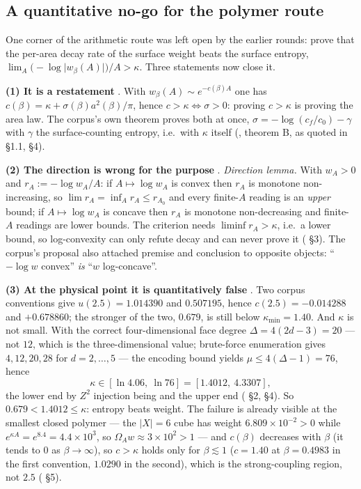 \subsection{A quantitative no-go for the polymer route}
\label{sec:scalar-polymer}

One corner of the arithmetic route was left open by the earlier rounds: prove that the per-area
decay rate of the surface weight beats the surface entropy,
$\lim_A\bigl(-\log\lvert w_\beta(A)\rvert\bigr)/A>\kappa$. Three statements now close it.

\textbf{(1) It is a restatement} \LN. With $w_\beta(A)\sim e^{-c(\beta)A}$ one has
$c(\beta)=\kappa+\sigma(\beta)a^2(\beta)/\pi$, hence $c>\kappa\iff\sigma>0$: proving $c>\kappa$ is
proving the area law. The corpus's own theorem proves both at once,
$\sigma=-\log(c_f/c_0)-\gamma$ with $\gamma$ the surface-counting entropy, i.e.\ with $\kappa$
itself (, theorem B, as quoted in
 \S1.1, \S4).

\textbf{(2) The direction is wrong for the purpose} \LT. \emph{Direction lemma.} With $w_A>0$ and
$r_A:=-\log w_A/A$: if $A\mapsto\log w_A$ is convex then $r_A$ is monotone non-increasing, so
$\lim r_A=\inf_A r_A\le r_{A_0}$ and every finite-$A$ reading is an \emph{upper} bound; if
$A\mapsto\log w_A$ is concave then $r_A$ is monotone non-decreasing and finite-$A$ readings are
lower bounds. The criterion needs $\liminf r_A>\kappa$, i.e.\ a lower bound, so log-convexity can
only refute decay and can never prove it ( \S3). The corpus's proposal also
attached premise and conclusion to opposite objects: ``$-\log w$ convex'' \emph{is} ``$w$
log-concave''.

\textbf{(3) At the physical point it is quantitatively false} \LE. Two corpus conventions give
$u(2.5)=1.014390$ and $0.507195$, hence $c(2.5)=-0.014288$ and $+0.678860$; the stronger of the
two, $0.679$, is still below $\kappa_{\min}=1.40$. And $\kappa$ is not small. With the correct
four-dimensional face degree $\Delta=4(2d-3)=20$ --- not $12$, which is the three-dimensional value;
brute-force enumeration gives $4,12,20,28$ for $d=2,\dots,5$ --- the encoding bound yields
$\mu\le4(\Delta-1)=76$, hence
\begin{equation}
\kappa\in[\ln4.06,\ \ln76]=[1.4012,\ 4.3307],
\label{eq:scalar-kappa}
\end{equation}
the lower end by $Z^2$ injection being \LC{} and the upper end \LT{}
( \S2, \S4). So $0.679<1.4012\le\kappa$: entropy beats weight. The failure is
already visible at the smallest closed polymer --- the $\lvert X\rvert=6$ cube has weight
$6.809\times10^{-2}>0$ while $e^{\kappa A}=e^{8.4}=4.4\times10^{3}$, so $\Omega_Aw\approx3\times
10^{2}>1$ --- and $c(\beta)$ decreases with $\beta$ (it tends to $0$ as $\beta\to\infty$), so
$c>\kappa$ holds only for $\beta\lesssim1$ ($c=1.40$ at $\beta=0.4983$ in the first convention,
$1.0290$ in the second), which is the strong-coupling region, not $2.5$
( \S5).

